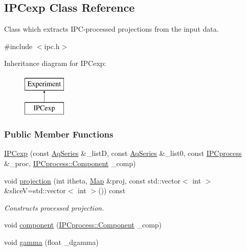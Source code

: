 \hypertarget{classIPCexp}{
\subsection{IPCexp Class Reference}
\label{classIPCexp}
}


Class which extracts IPC-\/processed projections from the input data.  




{\ttfamily \#include $<$ipc.h$>$}

Inheritance diagram for IPCexp:\begin{figure}[H]
\begin{center}
\leavevmode
\includegraphics[height=2.000000cm]{classIPCexp}
\end{center}
\end{figure}
\subsubsection*{Public Member Functions}
\begin{DoxyCompactItemize}
\item 
\hyperlink{classIPCexp_a70b3e376a918f904afdc021b4f2e592c}{IPCexp} (const \hyperlink{classAqSeries}{AqSeries} \&\_\-listD, const \hyperlink{classAqSeries}{AqSeries} \&\_\-list0, const \hyperlink{classIPCprocess}{IPCprocess} \&\_\-proc, \hyperlink{classIPCprocess_a9e159369437f40cc3340171a0f6d3418}{IPCprocess::Component} \_\-comp)
\item 
void \hyperlink{classIPCexp_a0367f181f0d59e3504167c931a3c872e}{projection} (int itheta, \hyperlink{group__Types_ga8747378c016fc11d9ecbb98787248c25}{Map} \&proj, const std::vector$<$ int $>$ \&sliceV=std::vector$<$ int $>$()) const 
\begin{DoxyCompactList}\small\item\em Constructs processed projection. \item\end{DoxyCompactList}\item 
void \hyperlink{classIPCexp_a5c88b5dbb87cd1601d097ddebf6e78ef}{component} (\hyperlink{classIPCprocess_a9e159369437f40cc3340171a0f6d3418}{IPCprocess::Component} \_\-comp)
\item 
void \hyperlink{classIPCexp_ab8e7b35780ae83affccf1b960deff098}{gamma} (float \_\-dgamma)
\end{DoxyCompactItemize}
